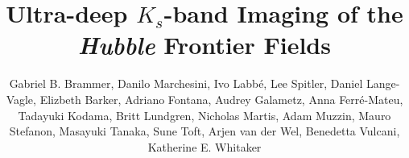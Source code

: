 \documentclass[preprint2]{aastex6}
\begin{document}
\title{Ultra-deep $K_s$-band Imaging of the \textit{Hubble} Frontier Fields}


\author{Gabriel B. Brammer,
Danilo Marchesini,
Ivo Labb\'e, 
Lee Spitler, 
Daniel Lange-Vagle,
Elizbeth Barker,
Adriano Fontana,
Audrey Galametz,
Anna Ferr\'e-Mateu,
Tadayuki Kodama,
Britt Lundgren,
Nicholas Martis,
Adam Muzzin,
Mauro Stefanon,
Masayuki Tanaka,
Sune Toft,
Arjen van der Wel,
Benedetta Vulcani, 
Katherine E. Whitaker
}


\end{document}
